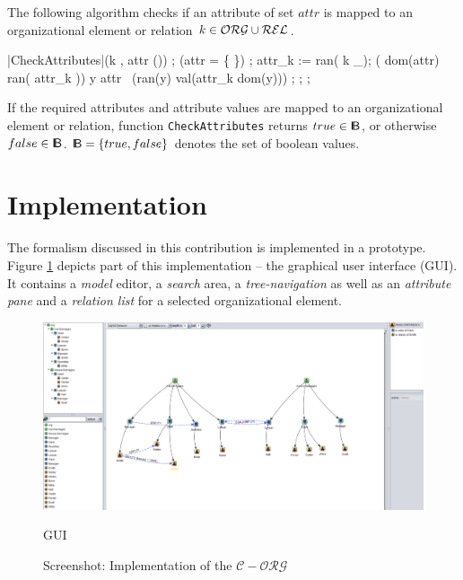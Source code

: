\noindent The following algorithm checks if an attribute of set $attr$ is mapped to an organizational element or relation $k \in \mathcal{ORG} \cup \mathcal{REL}$.

	\begin{samepage}
	{\small
	\NumberProgramstrue
	\begin{algorithm}[CheckAttributes]\label{alg:CheckAttributes}
	\begin{program}
	\FUNCT |CheckAttributes|(k \in \OrgElementMenge \cup \relationen, attr \subset (\Bezeichner \times \WerteMenge)) \subset \boole
	\BEGIN
	\var {};
	\IF (attr = \{ \})
		\THEN \RETURN \quad \true;
	\ELSE
		attr_k := ran( k \lhd \rel_{\attribute});
		\IF ( dom(attr) \subset ran( attr_k ))
		\THEN
			\FOREACH y \in attr~\DO
				\IF (ran(y) \neq val(attr_k \rhd dom(y)))
				\THEN \RETURN \quad \false;
				\FI
			\OD
			\RETURN \quad \true;
		\ELSE \RETURN \quad \false;
		\FI
	\FI
	\END
	\end{program}
	\end{algorithm}
	\NumberProgramsfalse
	}
	\end{samepage}

\noindent If the required attributes and attribute values are mapped to an organizational element or relation, function {\tt CheckAttributes} returns $true \in { \sf I\!B}$, or otherwise $false \in { \sf I\!B}$. ${ \sf I\!B} = \{ true, false \}$ denotes the set of boolean values.

\section{Implementation}
The formalism discussed in this contribution is implemented in a prototype. Figure \ref{proto-gui} depicts part of this implementation -- the graphical user interface (GUI). It contains a \emph{model} editor, a \emph{search} area, a \emph{tree-navigation} as well as an \emph{attribute pane} and a \emph{relation list} for a selected organizational element.

\begin{figure}
\centering
\includegraphics[width=\textwidth]{Figures/corg}
\caption{Screenshot: Implementation of the $\mathcal{C-ORG}$} GUI
\label{proto-gui}
\end{figure}

